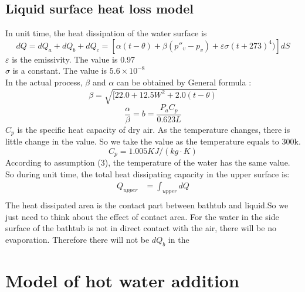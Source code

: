 \documentclass{mcmthesis}
\begin{document}
\subsection{Liquid surface heat loss model}
\indent In unit time, the heat dissipation of the water surface is \cite{1}
\begin{equation}
 dQ=dQ_{a}+dQ_{b}+dQ_{c}=[\alpha (t-\theta)+\beta ({p}''_{v}-p_{v})+\varepsilon \sigma (t+273)^{4})]dS 
\end{equation}
\indent \indent \indent $\varepsilon$ is the emissivity. The value is 0.97\\
\indent \indent \indent $\sigma$ is a constant. The value is $5.6\times 10^{-8}$\\
\indent \indent \indent In the actual process, $\beta$ and $\alpha$ can be obtained by General formula \cite{2}:\\
\begin{equation}
 \beta=\sqrt{[22.0+12.5W^{2}+2.0(t-\theta)}
\end{equation}
\begin{equation}
 \frac{\alpha}{\beta}=b=\frac{P_{a}C_{p}}{0.623L}
\end{equation}
\indent $C_{p}$ is the specific heat capacity of dry air. As the temperature changes, there is little change in the value. So we take the value as the temperature equals to 300k.\\
\begin{equation}
C_{p}=1.005KJ/(kg\cdot K)
\end{equation}
\indent According to assumption (3), the temperature of the water has the same value. So during unit time, the total heat dissipating capacity in the upper surface is:\\
\begin{equation}
\begin{split}
Q_{upper}&=\int_{upper} dQ\\
\end{split}
\end{equation}
\indent The heat dissipated area is the contact part between bathtub and liquid.So we just need to think about the effect of contact area. For the water in the side surface of the bathtub is not in direct contact with the air, there will be no evaporation. Therefore there will not be $ dQ_{b} $ in the 

\section{Model of hot water addition}
\end{document}
